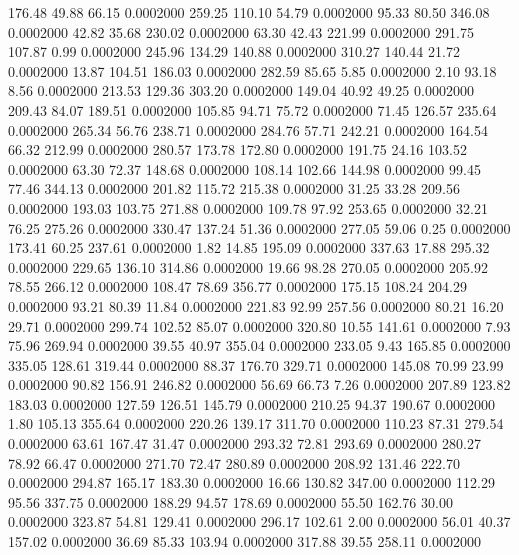  176.48   49.88   66.15   0.0002000
 259.25  110.10   54.79   0.0002000
  95.33   80.50  346.08   0.0002000
  42.82   35.68  230.02   0.0002000
  63.30   42.43  221.99   0.0002000
 291.75  107.87    0.99   0.0002000
 245.96  134.29  140.88   0.0002000
 310.27  140.44   21.72   0.0002000
  13.87  104.51  186.03   0.0002000
 282.59   85.65    5.85   0.0002000
   2.10   93.18    8.56   0.0002000
 213.53  129.36  303.20   0.0002000
 149.04   40.92   49.25   0.0002000
 209.43   84.07  189.51   0.0002000
 105.85   94.71   75.72   0.0002000
  71.45  126.57  235.64   0.0002000
 265.34   56.76  238.71   0.0002000
 284.76   57.71  242.21   0.0002000
 164.54   66.32  212.99   0.0002000
 280.57  173.78  172.80   0.0002000
 191.75   24.16  103.52   0.0002000
  63.30   72.37  148.68   0.0002000
 108.14  102.66  144.98   0.0002000
  99.45   77.46  344.13   0.0002000
 201.82  115.72  215.38   0.0002000
  31.25   33.28  209.56   0.0002000
 193.03  103.75  271.88   0.0002000
 109.78   97.92  253.65   0.0002000
  32.21   76.25  275.26   0.0002000
 330.47  137.24   51.36   0.0002000
 277.05   59.06    0.25   0.0002000
 173.41   60.25  237.61   0.0002000
   1.82   14.85  195.09   0.0002000
 337.63   17.88  295.32   0.0002000
 229.65  136.10  314.86   0.0002000
  19.66   98.28  270.05   0.0002000
 205.92   78.55  266.12   0.0002000
 108.47   78.69  356.77   0.0002000
 175.15  108.24  204.29   0.0002000
  93.21   80.39   11.84   0.0002000
 221.83   92.99  257.56   0.0002000
  80.21   16.20   29.71   0.0002000
 299.74  102.52   85.07   0.0002000
 320.80   10.55  141.61   0.0002000
   7.93   75.96  269.94   0.0002000
  39.55   40.97  355.04   0.0002000
 233.05    9.43  165.85   0.0002000
 335.05  128.61  319.44   0.0002000
  88.37  176.70  329.71   0.0002000
 145.08   70.99   23.99   0.0002000
  90.82  156.91  246.82   0.0002000
  56.69   66.73    7.26   0.0002000
 207.89  123.82  183.03   0.0002000
 127.59  126.51  145.79   0.0002000
 210.25   94.37  190.67   0.0002000
   1.80  105.13  355.64   0.0002000
 220.26  139.17  311.70   0.0002000
 110.23   87.31  279.54   0.0002000
  63.61  167.47   31.47   0.0002000
 293.32   72.81  293.69   0.0002000
 280.27   78.92   66.47   0.0002000
 271.70   72.47  280.89   0.0002000
 208.92  131.46  222.70   0.0002000
 294.87  165.17  183.30   0.0002000
  16.66  130.82  347.00   0.0002000
 112.29   95.56  337.75   0.0002000
 188.29   94.57  178.69   0.0002000
  55.50  162.76   30.00   0.0002000
 323.87   54.81  129.41   0.0002000
 296.17  102.61    2.00   0.0002000
  56.01   40.37  157.02   0.0002000
  36.69   85.33  103.94   0.0002000
 317.88   39.55  258.11   0.0002000
